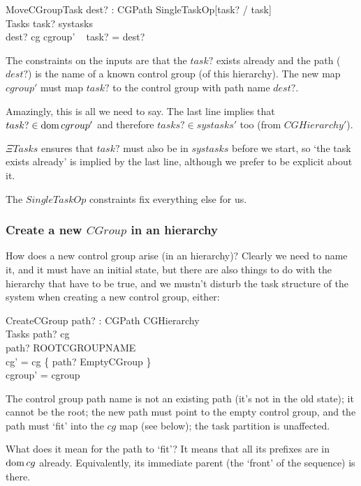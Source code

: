 \documentclass[a4paper,twoside,12pt]{article}
\begin{document}
\begin{schema}{MoveCGroupTask}
dest? : CGPath
\also
SingleTaskOp[task? / task] \\
\Xi Tasks 
\where
task? \in systasks \\
dest? \in \dom cg
\also
cgroup' ~ task?  = dest?
\end{schema}
The constraints on the inputs are that the $task?$ exists already and 
the path ($dest?$) is the name of a known control group (of this hierarchy).
The new map $cgroup'$ must map $task?$ to the control group with path name $dest?$.

Amazingly, this is all we need to say. The last line implies that $task? \in \mathop{\mathrm{dom}} cgroup'$ and therefore
$tasks? \in systasks'$ too (from $CGHierarchy'$). 

$\Xi Tasks$ ensures that $task?$ must also be in $systasks$ before we start, so `the task exists already' is implied by the last line, although we prefer to be explicit about it.

The $SingleTaskOp$ constraints fix everything else for us.

\subsubsection{Create a new $CGroup$ in an hierarchy}

How does a new control group arise (in an hierarchy)?
Clearly we need to name it, and it must have an initial state, but there are also things to do with the
hierarchy that have to be true, and we mustn't disturb the task structure of the system when
creating a new control group, either:

\begin{schema}{CreateCGroup}
path? : CGPath
\also
\Delta CGHierarchy \\
\Xi Tasks
\where
path? \notin \dom cg \\
path? \neq ROOTCGROUPNAME \\
cg' = cg \cup \{ path? \mapsto EmptyCGroup \} \\
cgroup' = cgroup
\end{schema}
The control group path name is not an existing path (it's not in the old state); it cannot be the root; the new path must point to the empty control group, and the path must `fit' into the $cg$ map (see below); the task partition is unaffected.

What does it mean for the path to `fit'? It means that all its prefixes are in $\mathop{\mathrm{dom}} cg$ already. Equivalently, its immediate parent (the `front' of the sequence) is there.
\end{document}
